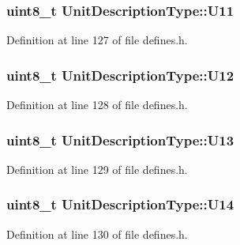 \hypertarget{structUnitDescriptionType_a73d351d321ae6bbcd5ad8c14c96ad0a8}{
\subsubsection[{U11}]{\setlength{\rightskip}{0pt plus 5cm}uint8\-\_\-t Unit\-Description\-Type\-::\-U11}}\label{structUnitDescriptionType_a73d351d321ae6bbcd5ad8c14c96ad0a8}


Definition at line 127 of file defines.\-h.

\hypertarget{structUnitDescriptionType_a31d9700085a4dcf3e0d2298e8c877f5f}{
\subsubsection[{U12}]{\setlength{\rightskip}{0pt plus 5cm}uint8\-\_\-t Unit\-Description\-Type\-::\-U12}}\label{structUnitDescriptionType_a31d9700085a4dcf3e0d2298e8c877f5f}


Definition at line 128 of file defines.\-h.

\hypertarget{structUnitDescriptionType_a686a531e040eca159c41bba7705d8963}{
\subsubsection[{U13}]{\setlength{\rightskip}{0pt plus 5cm}uint8\-\_\-t Unit\-Description\-Type\-::\-U13}}\label{structUnitDescriptionType_a686a531e040eca159c41bba7705d8963}


Definition at line 129 of file defines.\-h.

\hypertarget{structUnitDescriptionType_a4a6129e1bed33bf743895f5864208cc0}{
\subsubsection[{U14}]{\setlength{\rightskip}{0pt plus 5cm}uint8\-\_\-t Unit\-Description\-Type\-::\-U14}}\label{structUnitDescriptionType_a4a6129e1bed33bf743895f5864208cc0}


Definition at line 130 of file defines.\-h.

